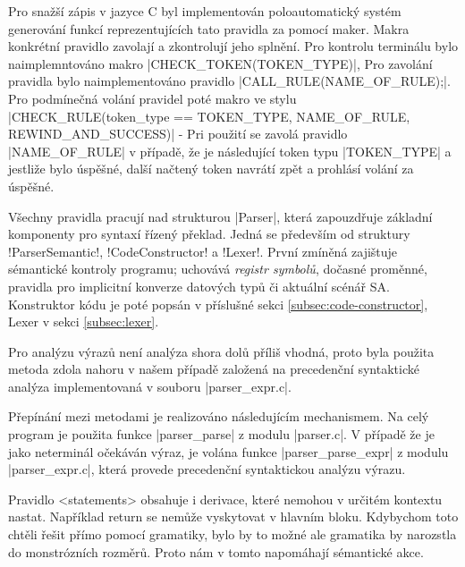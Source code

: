 Pro snažší zápis v jazyce C byl implementován poloautomatický systém generování funkcí reprezentujících tato pravidla za pomocí maker.
Makra konkrétní pravidlo zavolají a zkontrolují jeho splnění. Pro kontrolu terminálu bylo naimplemntováno makro
\ic|CHECK_TOKEN(TOKEN_TYPE)|,
Pro zavolání pravidla bylo naimplementováno pravidlo \ic|CALL_RULE(NAME_OF_RULE);|.
Pro podmínečná volání pravidel poté makro ve stylu
\ic|CHECK_RULE(token_type == TOKEN_TYPE, NAME_OF_RULE, REWIND_AND_SUCCESS)| - Pri použití se zavolá pravidlo
\ic|NAME_OF_RULE| v případě, že je následující token typu \ic|TOKEN_TYPE| a jestliže bylo úspěšné, další načtený
token navrátí zpět a prohlásí volání za úspěšné.

Všechny pravidla pracují nad strukturou \ic|Parser|, která zapouzdřuje základní komponenty pro syntaxí řízený překlad.
Jedná se především od struktury \ic!ParserSemantic!, \ic!CodeConstructor! a \ic!Lexer!. První zmíněná zajištuje sémantické
kontroly programu; uchovává \emph{registr symbolů}, dočasné proměnné, pravidla pro implicitní konverze datových typů či
aktuální scénář SA. Konstruktor kódu je poté popsán v příslušné sekci \ref{subsec:code-constructor}, Lexer v sekci
\ref{subsec:lexer}.

Pro analýzu výrazů není analýza shora dolů příliš vhodná, proto byla
použita metoda zdola nahoru v našem případě založená na precedenční
syntaktické analýza implementovaná v souboru \ic|parser_expr.c|.

Přepínání mezi metodami je realizováno následujícím mechanismem. Na celý program je použita funkce \ic|parser_parse|
z modulu \ic|parser.c|. V případě že je jako neterminál očekáván výraz, je volána funkce \ic|parser_parse_expr|
z modulu \ic|parser_expr.c|, která provede precedenční syntaktickou analýzu výrazu.

Pravidlo <statements> obsahuje i derivace, které nemohou v určitém kontextu nastat.
Například return se nemůže vyskytovat v hlavním bloku. Kdybychom toto chtěli řešit
přímo pomocí gramatiky, bylo by to možné ale gramatika by narozstla do monstrózních rozměrů.
Proto nám v tomto napomáhají sémantické akce.


